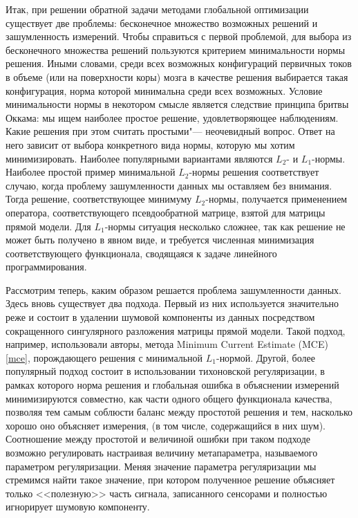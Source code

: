 Итак, при решении обратной задачи методами глобальной оптимизации существует
две проблемы: бесконечное множество возможных решений и зашумленность
измерений. Чтобы справиться с первой проблемой, для выбора из бесконечного
множества решений пользуются критерием минимальности нормы решения.  Иными
словами, среди всех возможных конфигураций первичных токов в объеме (или на
поверхности коры) мозга в качестве решения выбирается такая конфигурация, норма
которой минимальна среди всех возможных.  Условие минимальности нормы в
некотором смысле является следствие принципа бритвы Оккама: мы ищем наиболее
простое решение, удовлетворяющее наблюдениям.  Какие решения при этом считать
простыми"--- неочевидный вопрос.  Ответ на него зависит от выбора конкретного
вида нормы, которую мы хотим минимизировать.  Наиболее популярными вариантами
являются $L_2$- и $L_1$-нормы.  Наиболее простой пример минимальной $L_2$-нормы
решения соответствует случаю, когда проблему зашумленности данных мы оставляем
без внимания.  Тогда решение, соответствующее минимуму $L_2$-нормы, получается
применением оператора, соответствующего псевдообратной матрице, взятой для
матрицы прямой модели.  Для $L_1$-нормы ситуация несколько сложнее, так как
решение не может быть получено в явном виде, и требуется численная минимизация
соответствующего функционала, сводящаяся к задаче линейного программирования.

Рассмотрим теперь, каким образом решается проблема зашумленности данных. Здесь
вновь существует два подхода.  Первый из них используется значительно реже и
состоит в удалении шумовой компоненты из данных посредством сокращенного
сингулярного разложения матрицы прямой модели. Такой подход, например,
использовали авторы, метода Minimum Current Estimate (MCE) \ref{mce},
порождающего решения с минимальной $L_1$-нормой. Другой, более популярный
подход состоит в использовании тихоновской регуляризации, в рамках которого
норма решения и глобальная ошибка в объяснении измерений минимизируются
совместно, как части одного общего функционала качества, позволяя тем самым
соблюсти баланс между простотой решения и тем, насколько хорошо оно объясняет
измерения, (в том числе, содержащийся в них шум).  Соотношение между простотой
и величиной ошибки при таком подходе возможно регулировать настраивая величину
метапараметра, называемого параметром регуляризации.  Меняя значение параметра
регуляризации мы стремимся найти такое значение, при котором полученное решение
объясняет только <<полезную>> часть сигнала, записанного сенсорами и полностью
игнорирует шумовую компоненту.

